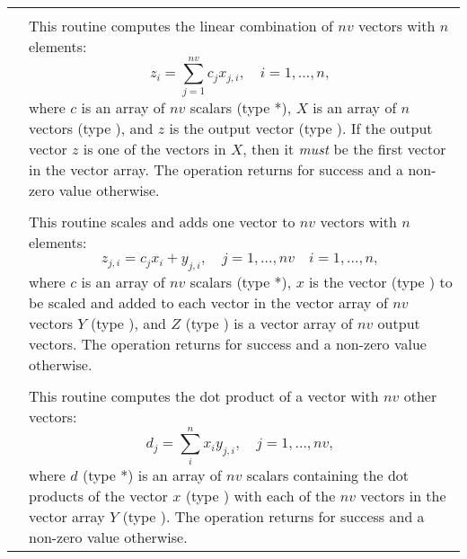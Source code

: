 \label{t:nvecfusedops}
\tablelasttail{\hline}
\begin{xtabular}{|p{\coloneb}|p{\coltwob}|}

 &  \\ 
& This routine computes the linear combination of $nv$ vectors with $n$
elements:
\begin{equation*}
z_i = \sum_{j=1}^{nv} c_j x_{j,i}, \quad i=1,\ldots,n,
\end{equation*}
where $c$ is an array of $nv$ scalars (type *), $X$ is an array of
$n$ vectors (type ), and $z$ is the output vector (type
). If the output vector $z$ is one of the vectors in $X$, then it
\textit{must} be the first vector in the vector array. The operation returns
 for success and a non-zero value otherwise.
\\[2mm]

 &  \\ 
& This routine scales and adds one vector to $nv$ vectors with $n$ elements:
\begin{equation*}
z_{j,i} = c_j x_i + y_{j,i}, \quad j=1,\ldots,nv \quad i=1,\ldots,n,
\end{equation*}
where $c$ is an array of $nv$ scalars (type *), $x$ is the vector
(type ) to be scaled and added to each vector in the vector array
of $nv$ vectors $Y$ (type ), and $Z$ (type ) is a
vector array of $nv$ output vectors. The operation returns  for success and a
non-zero value otherwise.
\\[2mm]

 &  \\ 
& This routine computes the dot product of a vector with $nv$ other vectors:
\begin{equation*}
d_j = \sum_{i}^{n} x_i y_{j,i}, \quad j=1,\ldots,nv,
\end{equation*}
where $d$ (type *) is an array of $nv$ scalars containing the
dot products of the vector $x$ (type ) with each of the $nv$
vectors in the vector array $Y$ (type ). The operation returns
 for success and a non-zero value otherwise.
\\[2mm]

\end{xtabular}
\bigskip


